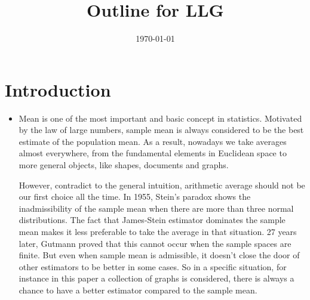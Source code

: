\documentclass[a4paper]{article}
\title{Outline for LLG}
\date{\today}
\begin{document}
\maketitle

\section{Introduction}

\begin{itemize}
\item Mean is one of the most important and basic concept in statistics. Motivated by the law of large numbers, sample mean is always considered to be the best estimate of the population mean. As a result, nowadays we take averages almost everywhere, from the fundamental elements in Euclidean space to more general objects, like shapes, documents and graphs.

However, contradict to the general intuition, arithmetic average should not be our first choice all the time. In 1955, Stein's paradox shows the inadmissibility of the sample mean when there are more than three normal distributions. The fact that James-Stein estimator dominates the sample mean makes it less preferable to take the average in that situation. 27 years later, Gutmann proved that this cannot occur when the sample spaces are finite. But even when sample mean is admissible, it doesn't close the door of other estimators to be better in some cases. So in a specific situation, for instance in this paper a collection of graphs is considered, there is always a chance to have a better estimator compared to the sample mean.





\end{itemize}
\end{document}
